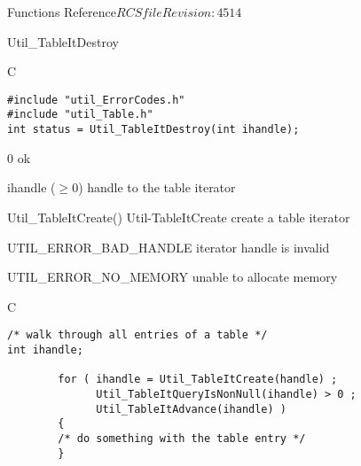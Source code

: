 \begin{cactuspart}{ Functions Reference}{$RCSfile$}{$Revision: 4514 $}
\begin{FunctionDescription}{Util\_TableItDestroy}
\begin{SynopsisSection}
\begin{Synopsis}{C}
\begin{verbatim}
#include "util_ErrorCodes.h"
#include "util_Table.h"
int status = Util_TableItDestroy(int ihandle);
\end{verbatim}
\end{Synopsis}
\end{SynopsisSection}

\begin{ResultSection}
\begin{Result}{\rm 0}
ok
\end{Result}
\end{ResultSection}

\begin{ParameterSection}
\begin{Parameter}{ihandle ($\ge 0$)}
handle to the table iterator
\end{Parameter}
\end{ParameterSection}

\begin{Discussion}
\end{Discussion}

\begin{SeeAlsoSection}
\begin{SeeAlso2} {Util\_TableItCreate()} {Util-TableItCreate}
create a table iterator
\end{SeeAlso2}
\end{SeeAlsoSection}

\begin{ErrorSection}
\begin{Error}{UTIL\_ERROR\_BAD\_HANDLE}
iterator handle is invalid
\end{Error}
\begin{Error}{UTIL\_ERROR\_NO\_MEMORY}
unable to allocate memory
\end{Error}
\end{ErrorSection}

\begin{ExampleSection}
\begin{Example}{C}
\begin{verbatim}
/* walk through all entries of a table */
int ihandle;

        for ( ihandle = Util_TableItCreate(handle) ;
              Util_TableItQueryIsNonNull(ihandle) > 0 ;
              Util_TableItAdvance(ihandle) )
        {
        /* do something with the table entry */
        }


\end{verbatim}
\end{Example}
\end{ExampleSection}
\end{FunctionDescription}
\end{cactuspart}

